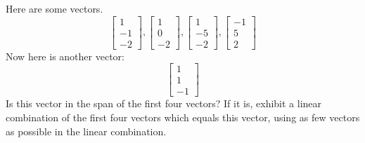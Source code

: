 \documentclass{ximera}
\begin{document}
\begin{problem}\label{prb:3.12} Here are some vectors.
\begin{equation*}
\left[
\begin{array}{r}
1 \\
-1 \\
-2
\end{array}
\right] ,\left[
\begin{array}{r}
1 \\
0 \\
-2
\end{array}
\right] ,\left[
\begin{array}{r}
1 \\
-5 \\
-2
\end{array}
\right] ,\left[
\begin{array}{r}
-1 \\
5 \\
2
\end{array}
\right]
\end{equation*}
Now here is another vector:\
\begin{equation*}
\left[
\begin{array}{r}
1 \\
1 \\
-1
\end{array}
\right]
\end{equation*}
Is this vector in the span of the first four vectors? If it is, exhibit a
linear combination of the first four vectors which equals this vector, using
as few vectors as possible in the linear combination.
\end{problem}
\end{document}
